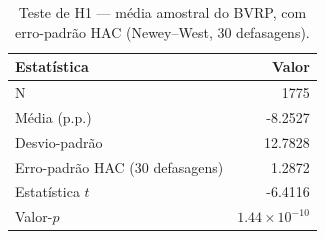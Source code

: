 \begin{table}[H]
\centering
\caption{Teste de H1 --- média amostral do BVRP, com erro-padrão HAC (Newey--West, 30 defasagens).}
\label{tab:retlin-h1}
\begin{tabular}{lr}
\toprule
Estatística & Valor \\
\midrule
N & 1775 \\
Média (p.p.) & -8.2527 \\
Desvio-padrão & 12.7828 \\
Erro-padrão HAC (30 defasagens) & 1.2872 \\
Estatística $t$ & -6.4116 \\
Valor-$p$ & $1.44 \times 10^{-10}$ \\
\bottomrule
\end{tabular}
\end{table}
